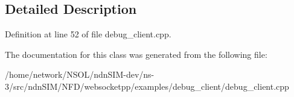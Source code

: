 \subsection{Detailed Description}


Definition at line 52 of file debug\+\_\+client.\+cpp.



The documentation for this class was generated from the following file\+:\begin{DoxyCompactItemize}
\item 
/home/network/\+N\+S\+O\+L/ndn\+S\+I\+M-\/dev/ns-\/3/src/ndn\+S\+I\+M/\+N\+F\+D/websocketpp/examples/debug\+\_\+client/debug\+\_\+client.\+cpp\end{DoxyCompactItemize}
